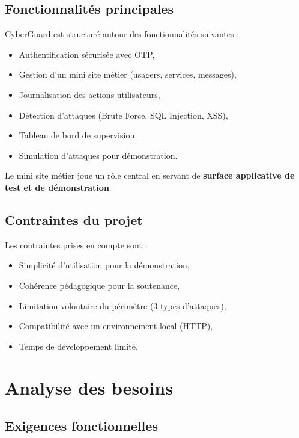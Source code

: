 \documentclass[a4paper,12pt]{report}
\begin{document}
    \subsection{Fonctionnalités principales}
    
    CyberGuard est structuré autour des fonctionnalités suivantes :
    
    \begin{itemize}
        \item Authentification sécurisée avec OTP,
        \item Gestion d'un mini site métier (usagers, services, messages),
        \item Journalisation des actions utilisateurs,
        \item Détection d'attaques (Brute Force, SQL Injection, XSS),
        \item Tableau de bord de supervision,
        \item Simulation d'attaques pour démonstration.
    \end{itemize}
    
    Le mini site métier joue un rôle central en servant de \textbf{surface applicative de test et de démonstration}.
    
    \subsection{Contraintes du projet}
    
    Les contraintes prises en compte sont :
    
    \begin{itemize}
        \item Simplicité d'utilisation pour la démonstration,
        \item Cohérence pédagogique pour la soutenance,
        \item Limitation volontaire du périmètre (3 types d'attaques),
        \item Compatibilité avec un environnement local (HTTP),
        \item Temps de développement limité.
    \end{itemize}
    
    \section{Analyse des besoins}
    
    \subsection{Exigences fonctionnelles}
   
\end{document}
